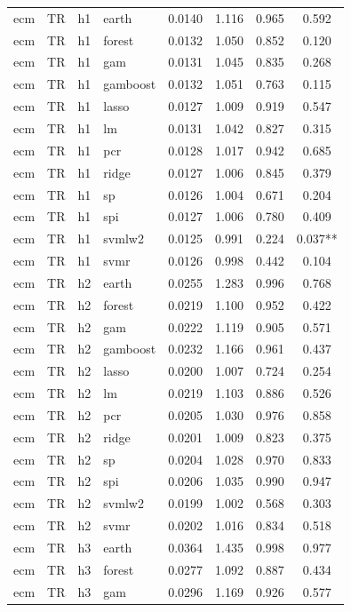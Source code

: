 \begin{ThreePartTable}
\begin{longtable}[t]{llclcccc}
\addlinespace
ecm & TR & h1 & earth & 0.0140 & 1.116 & 0.965 & 0.592\\
ecm & TR & h1 & forest & 0.0132 & 1.050 & 0.852 & 0.120\\
ecm & TR & h1 & gam & 0.0131 & 1.045 & 0.835 & 0.268\\
ecm & TR & h1 & gamboost & 0.0132 & 1.051 & 0.763 & 0.115\\
ecm & TR & h1 & lasso & 0.0127 & 1.009 & 0.919 & 0.547\\
ecm & TR & h1 & lm & 0.0131 & 1.042 & 0.827 & 0.315\\
ecm & TR & h1 & pcr & 0.0128 & 1.017 & 0.942 & 0.685\\
ecm & TR & h1 & ridge & 0.0127 & 1.006 & 0.845 & 0.379\\
ecm & TR & h1 & sp & 0.0126 & 1.004 & 0.671 & 0.204\\
ecm & TR & h1 & spi & 0.0127 & 1.006 & 0.780 & 0.409\\
ecm & TR & h1 & svmlw2 & 0.0125 & 0.991 & 0.224 & 0.037**\\
ecm & TR & h1 & svmr & 0.0126 & 0.998 & 0.442 & 0.104\\
\addlinespace
ecm & TR & h2 & earth & 0.0255 & 1.283 & 0.996 & 0.768\\
ecm & TR & h2 & forest & 0.0219 & 1.100 & 0.952 & 0.422\\
ecm & TR & h2 & gam & 0.0222 & 1.119 & 0.905 & 0.571\\
ecm & TR & h2 & gamboost & 0.0232 & 1.166 & 0.961 & 0.437\\
ecm & TR & h2 & lasso & 0.0200 & 1.007 & 0.724 & 0.254\\
ecm & TR & h2 & lm & 0.0219 & 1.103 & 0.886 & 0.526\\
ecm & TR & h2 & pcr & 0.0205 & 1.030 & 0.976 & 0.858\\
ecm & TR & h2 & ridge & 0.0201 & 1.009 & 0.823 & 0.375\\
ecm & TR & h2 & sp & 0.0204 & 1.028 & 0.970 & 0.833\\
ecm & TR & h2 & spi & 0.0206 & 1.035 & 0.990 & 0.947\\
ecm & TR & h2 & svmlw2 & 0.0199 & 1.002 & 0.568 & 0.303\\
ecm & TR & h2 & svmr & 0.0202 & 1.016 & 0.834 & 0.518\\
\addlinespace
ecm & TR & h3 & earth & 0.0364 & 1.435 & 0.998 & 0.977\\
ecm & TR & h3 & forest & 0.0277 & 1.092 & 0.887 & 0.434\\
ecm & TR & h3 & gam & 0.0296 & 1.169 & 0.926 & 0.577\\

\end{longtable}
\end{ThreePartTable}

